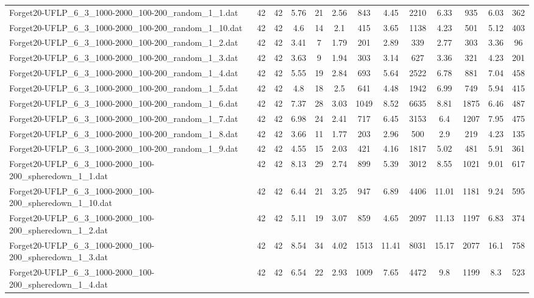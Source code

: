 \begin{table}[!ht]
{\begin{tabular}{lcccccccccccc}
Forget20-UFLP\_6\_3\_1000-2000\_100-200\_random\_1\_1.dat & 42 & 42 & 5.76 & 21 & 2.56 & 843 & 4.45 & 2210 & 6.33 & 935 & 6.03 & 362 \\
Forget20-UFLP\_6\_3\_1000-2000\_100-200\_random\_1\_10.dat & 42 & 42 & 4.6 & 14 & 2.1 & 415 & 3.65 & 1138 & 4.23 & 501 & 5.12 & 403 \\
Forget20-UFLP\_6\_3\_1000-2000\_100-200\_random\_1\_2.dat & 42 & 42 & 3.41 & 7 & 1.79 & 201 & 2.89 & 339 & 2.77 & 303 & 3.36 & 96 \\
Forget20-UFLP\_6\_3\_1000-2000\_100-200\_random\_1\_3.dat & 42 & 42 & 3.63 & 9 & 1.94 & 303 & 3.14 & 627 & 3.36 & 321 & 4.23 & 201 \\
Forget20-UFLP\_6\_3\_1000-2000\_100-200\_random\_1\_4.dat & 42 & 42 & 5.55 & 19 & 2.84 & 693 & 5.64 & 2522 & 6.78 & 881 & 7.04 & 458 \\
Forget20-UFLP\_6\_3\_1000-2000\_100-200\_random\_1\_5.dat & 42 & 42 & 4.8 & 18 & 2.5 & 641 & 4.48 & 1942 & 6.99 & 749 & 5.94 & 415 \\
Forget20-UFLP\_6\_3\_1000-2000\_100-200\_random\_1\_6.dat & 42 & 42 & 7.37 & 28 & 3.03 & 1049 & 8.52 & 6635 & 8.81 & 1875 & 6.46 & 487 \\
Forget20-UFLP\_6\_3\_1000-2000\_100-200\_random\_1\_7.dat & 42 & 42 & 6.98 & 24 & 2.41 & 717 & 6.45 & 3153 & 6.4 & 1207 & 7.95 & 475 \\
Forget20-UFLP\_6\_3\_1000-2000\_100-200\_random\_1\_8.dat & 42 & 42 & 3.66 & 11 & 1.77 & 203 & 2.96 & 500 & 2.9 & 219 & 4.23 & 135 \\
Forget20-UFLP\_6\_3\_1000-2000\_100-200\_random\_1\_9.dat & 42 & 42 & 4.55 & 15 & 2.03 & 421 & 4.16 & 1817 & 5.02 & 481 & 5.91 & 361 \\
Forget20-UFLP\_6\_3\_1000-2000\_100-200\_spheredown\_1\_1.dat & 42 & 42 & 8.13 & 29 & 2.74 & 899 & 5.39 & 3012 & 8.55 & 1021 & 9.01 & 617 \\
Forget20-UFLP\_6\_3\_1000-2000\_100-200\_spheredown\_1\_10.dat & 42 & 42 & 6.44 & 21 & 3.25 & 947 & 6.89 & 4406 & 11.01 & 1181 & 9.24 & 595 \\
Forget20-UFLP\_6\_3\_1000-2000\_100-200\_spheredown\_1\_2.dat & 42 & 42 & 5.11 & 19 & 3.07 & 859 & 4.65 & 2097 & 11.13 & 1197 & 6.83 & 374 \\
Forget20-UFLP\_6\_3\_1000-2000\_100-200\_spheredown\_1\_3.dat & 42 & 42 & 8.54 & 34 & 4.02 & 1513 & 11.41 & 8031 & 15.17 & 2077 & 16.1 & 758 \\
Forget20-UFLP\_6\_3\_1000-2000\_100-200\_spheredown\_1\_4.dat & 42 & 42 & 6.54 & 22 & 2.93 & 1009 & 7.65 & 4472 & 9.8 & 1199 & 8.3 & 523 \\

\end{tabular}}
\end{table}
